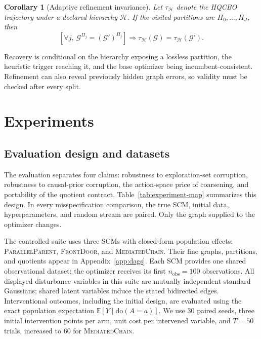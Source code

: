 \documentclass[twoside]{article}
\newtheorem{corollary}{Corollary}
\newcommand{\E}{\mathbb{E}}
\newcommand{\doo}{\mathrm{do}}
\newcommand{\Gg}{\mathcal{G}}
\begin{document}
\begin{corollary}[Adaptive refinement invariance]
\label{cor:adaptive-invariance}
Let \(\tau_{\mathcal H}\) denote the HQCBO trajectory under a declared hierarchy \(\mathcal H\). If the visited partitions are \(\Pi_0,\ldots,\Pi_J\), then
\[
 \left[\forall j,\ \Gg^{\Pi_j}=(\Gg')^{\Pi_j}\right]
 \Longrightarrow
 \tau_{\mathcal H}(\Gg)=\tau_{\mathcal H}(\Gg').
\]
\end{corollary}

Recovery is conditional on the hierarchy exposing a lossless partition, the heuristic trigger reaching it, and the base optimizer being incumbent-consistent. Refinement can also reveal previously hidden graph errors, so validity must be checked after every split.
\section{Experiments}
\label{sec:experiments}

\subsection{Evaluation design and datasets}
\label{sec:exp-design}

The evaluation separates four claims: robustness to exploration-set corruption, robustness to causal-prior corruption, the action-space price of coarsening, and portability of the quotient contract. Table~\ref{tab:experiment-map} summarizes this design. In every misspecification comparison, the true SCM, initial data, hyperparameters, and random stream are paired. Only the graph supplied to the optimizer changes.

The controlled suite uses three SCMs with closed-form population effects: \textsc{ParallelParent}, \textsc{FrontDoor}, and \textsc{MediatedChain}. Their fine graphs, partitions, and quotients appear in Appendix~\ref{app:dags}. Each SCM provides one shared observational dataset; the optimizer receives its first $n_{\mathrm{obs}}=100$ observations. All displayed disturbance variables in this suite are mutually independent standard Gaussians; shared latent variables induce the stated bidirected edges. Interventional outcomes, including the initial design, are evaluated using the exact population expectation $\E[Y\mid\doo(A=a)]$. We use $30$ paired seeds, three initial intervention points per arm, unit cost per intervened variable, and $T=50$ trials, increased to $60$ for \textsc{MediatedChain}.
\end{document}
